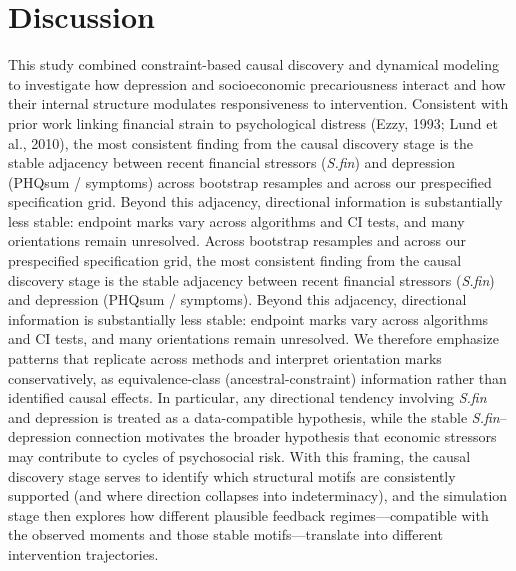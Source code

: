 \documentclass[
]{article}
\begin{document}
\restoregeometry

\section{Discussion}\label{discussion}

This study combined constraint-based causal discovery and dynamical
modeling to investigate how depression and socioeconomic precariousness
interact and how their internal structure modulates responsiveness to
intervention. Consistent with prior work linking financial strain to
psychological distress (Ezzy, 1993; Lund et al., 2010),
\textcolor{BrickRed}{the most consistent finding from the causal discovery stage is the stable adjacency between recent financial stressors (\textit{S.fin}) and depression (PHQsum / symptoms) across bootstrap resamples and across our prespecified specification grid. Beyond this adjacency, directional information is substantially less stable: endpoint marks vary across algorithms and CI tests, and many orientations remain unresolved.}
\textcolor{BrickRed}{
Across bootstrap resamples and across our prespecified specification grid, the most consistent finding from the causal discovery stage is the stable adjacency between recent financial stressors (\textit{S.fin}) and depression (PHQsum / symptoms). Beyond this adjacency, directional information is substantially less stable: endpoint marks vary across algorithms and CI tests, and many orientations remain unresolved. We therefore emphasize patterns that replicate across methods and interpret orientation marks conservatively, as equivalence-class (ancestral-constraint) information rather than identified causal effects. In particular, any directional tendency involving \textit{S.fin} and depression is treated as a data-compatible hypothesis, while the stable \textit{S.fin}--depression connection motivates the broader hypothesis that economic stressors may contribute to cycles of psychosocial risk.}
\textcolor{BrickRed}{
With this framing, the causal discovery stage serves to identify which structural motifs are consistently supported (and where direction collapses into indeterminacy), and the simulation stage then explores how different plausible feedback regimes—compatible with the observed moments and those stable motifs—translate into different intervention trajectories.}
\end{document}
